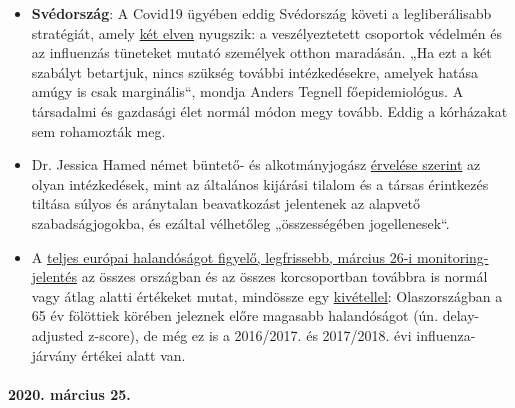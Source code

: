 \begin{itemize}
\tightlist
\item
  \textbf{Svédország}: A Covid19 ügyében eddig Svédország követi a
  legliberálisabb stratégiát, amely
  \href{https://www.zeit.de/politik/ausland/2020-03/coronavirus-schweden-stockholm-oeffentliches-leben/komplettansicht}{két
  elven} nyugszik: a veszélyeztetett csoportok védelmén és az influenzás
  tüneteket mutató személyek otthon maradásán. „Ha ezt a két szabályt
  betartjuk, nincs szükség további intézkedésekre, amelyek hatása amúgy
  is csak marginális``, mondja Anders Tegnell főepidemiológus. A
  társadalmi és gazdasági élet normál módon megy tovább. Eddig a
  kórházakat sem rohamozták meg.
\item
  Dr. Jessica Hamed német büntető- és alkotmányjogász
  \href{https://www.fr.de/politik/coronakrise-deutschland-sind-kontaktsperren-ausgangsbeschraenkungen-rechtswidrig-13611821.html}{érvelése
  szerint} az olyan intézkedések, mint az általános kijárási tilalom és
  a társas érintkezés tiltása súlyos és aránytalan beavatkozást
  jelentenek az alapvető szabadságjogokba, és ezáltal vélhetőleg
  „összességében jogellenesek``.
\item
  A \href{https://www.euromomo.eu/index.html}{teljes európai
  halandóságot figyelő, legfrissebb, március 26-i monitoring-jelentés}
  az összes országban és az összes korcsoportban továbbra is normál vagy
  átlag alatti értékeket mutat, mindössze egy
  \href{https://www.euromomo.eu/outputs/zscore_country65.html}{kivétellel}:
  Olaszországban a 65 év fölöttiek körében jeleznek előre magasabb
  halandóságot (ún. delay-adjusted z-score), de még ez is a 2016/2017.
  és 2017/2018. évi influenza-járvány értékei alatt van.
\end{itemize}

\hypertarget{2020-muxe1rcius-25}{%
\paragraph{2020. március 25.}\label{2020-muxe1rcius-25}}

